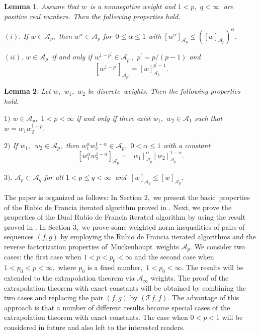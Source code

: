 \documentclass[a4paper]{amsart}
\theoremstyle{plain}
\newtheorem{lemma}{Lemma}[section]
\numberwithin{equation}{section}
\begin{document}
\begin{lemma}
\cite{samir} Assume that $w$\ is a nonnegative weight and $1<p,$ $q<\infty \ 
$ are positive real numbers. Then the following properties hold.

$(i).$ If $w\in \mathcal{A}_{p},$ then $w^{\alpha }\in \mathcal{A}_{p}$ for\ 
$0\leq \alpha \leq 1$ with $\left[ w^{\alpha }\right] _{\mathcal{A}_{p}}\leq
\left( \left[ w\right] _{\mathcal{A}_{p}}\right) ^{\alpha }$.

$(ii).$ $w\in \mathcal{A}_{p}$\ if and only if $w^{1-p^{\prime }}\in 
\mathcal{A}_{p^{\prime }},$ $p^{\prime }=p/\left( p-1\right) $ and 
\begin{equation}
\ \left[ w^{1-p^{\prime }}\right] _{\mathcal{A}_{p^{\prime }}}=\left[ w%
\right] _{\mathcal{A}_{p}}^{p^{\prime }-1}.  \label{t*}
\end{equation}
\end{lemma}

\begin{lemma}
\cite{samir} Let $w,$ $w_{1},$ $w_{2}$ be discrete\ weights. Then the
following properties hold.

$1)$ $w\in \mathcal{A}_{p},$ $1<p<\infty $ if and only if there exist $%
w_{1}, $ $w_{2}\in \mathcal{A}_{1}$ such that $w=w_{1}w_{2}^{1-p}.$

$2)$ If $w_{1},$\ $w_{2}\in \mathcal{A}_{p},$ then $w_{1}^{\alpha
}w_{2}^{1-\alpha }\in \mathcal{A}_{p},$ $0<\alpha \leq 1$ with a constant \
\ 
\begin{equation*}
\left[ w_{1}^{\alpha }w_{2}^{1-\alpha }\right] _{\mathcal{A}_{p}}=\left[
w_{1}\right] _{\mathcal{A}_{p}}^{\alpha }\left[ w_{2}\right] _{\mathcal{A}%
_{p}}^{1-\alpha }.
\end{equation*}

$3).$ $\mathcal{A}_{p}\subset \mathcal{A}_{q}$ for all $1<p\leq q<\infty \ $%
and\ $\left[ w\right] _{\mathcal{A}_{q}}\leq \left[ w\right] _{\mathcal{A}%
_{p}}.$
\end{lemma}

The paper is organized as follows: In Section $2,$ we present the basic\
properties of the Rubio de Francia iterated algorithm proved in \cite{saker}%
. Next, we prove the properties of the Dual Rubio de Francia iterated
algorithm by using the result proved in \cite{saker}. In Section $3,$ we
prove some weighted norm inequalities of pairs of sequences $(f,g)$ by
employing the Rubio de Francia iterated algorithms and the reverse
factorization properties of\ Muckenhoupt\ weights $\mathcal{A}_{p}$. We
consider two cases: the first case when $1<p<p_{0}<\infty $ and the second
case when $1<p_{0}<p<\infty ,$ where $p_{0}$ is a fixed number,\ $%
1<p_{0}<\infty .$ The results will be extended to the extrapolation theorem
via $\mathcal{A}_{\infty }$ weights. The proof of the extrapolation theorem
with exact constants will be obtained by combining the two cases and
replacing the pair $(f,g)$ by $(\mathcal{T}f,f).$ The advantage of this
approach is that a number of different results become special cases of the
extrapolation theorem with exact constants. The case when $0<p<1$ will be
considered in future and also left to the interested readers.
\end{document}
